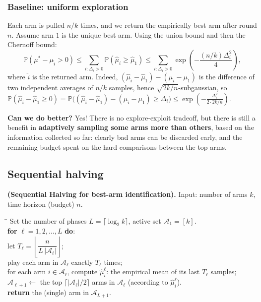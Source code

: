 \subsubsection*{Baseline: uniform exploration}

Each arm is pulled $n/k$ times, and we return the empirically best arm after round $n$. Assume arm $1$ is the unique best arm. Using the union bound and then the Chernoff bound:
\[
\mathbb{P}(\mu^* - \mu_{\hat{i}} > 0) \leq \sum_{i:\Delta_i > 0} \mathbb{P}(\hat{\mu}_i \geq \hat{\mu}_1) \leq \sum_{i:\Delta_i > 0} \exp\left(-\frac{(n/k)\Delta_i^2}{4}\right),
\]
where $\hat{i}$ is the returned arm. Indeed, $(\hat{\mu}_i - \hat{\mu}_1) - (\mu_i - \mu_1)$ is the difference of two independent averages of $n/k$ samples, hence $\sqrt{2k/n}$-subgaussian, so $\mathbb{P}(\hat{\mu}_i - \hat{\mu}_1 \geq 0) = \mathbb{P}\big((\hat{\mu}_i - \hat{\mu}_1) - (\mu_i - \mu_1) \geq \Delta_i\big) \leq \exp\left(-\frac{\Delta_i^2}{2 \cdot 2k/n}\right)$.

\textbf{Can we do better?} Yes! There is no explore-exploit tradeoff, but there is still a benefit in \textbf{adaptively sampling some arms more than others}, based on the information collected so far: clearly bad arms can be discarded early, and the remaining budget spent on the hard comparisons between the top arms.

\subsection{Sequential halving}

\begin{definition}\textbf{(Sequential Halving for best-arm identification).}
Input: number of arms $k$, time horizon (budget) $n$.
\begin{tabbing}
\hspace{1.5em}\=\kill
Set the number of phases $L = \lceil \log_2 k \rceil$, active set $\mathcal{A}_1 = [k]$. \\
\textbf{for} $\ell = 1, 2, \dots, L$ \textbf{do}: \\
\> let $T_\ell = \left\lfloor \dfrac{n}{L\,|\mathcal{A}_\ell|} \right\rfloor$; \\
\> play each arm in $\mathcal{A}_\ell$ exactly $T_\ell$ times; \\
\> for each arm $i \in \mathcal{A}_\ell$, compute $\hat{\mu}_i^\ell$: the empirical mean of its last $T_\ell$ samples; \\
\> $\mathcal{A}_{\ell+1} \leftarrow$ the top $\lceil |\mathcal{A}_\ell|/2 \rceil$ arms in $\mathcal{A}_\ell$ (according to $\hat{\mu}_i^\ell$). \\
\textbf{return} the (single) arm in $\mathcal{A}_{L+1}$.
\end{tabbing}
\end{definition}

